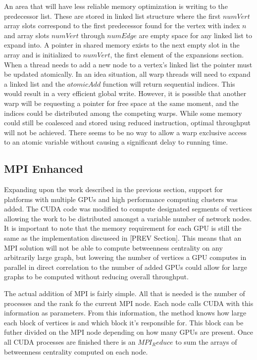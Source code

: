 \documentclass[12pt,twocolumn]{article}
\begin{document}
An area that will have less reliable memory optimization is writing to the predecessor list. These are stored in linked list structure where the first $numVert$ array slots correspond to the first predecessor found for the vertex with index $n$ and array slots $numVert$ through $numEdge$ are empty space for any linked list to expand into. A pointer in shared memory exists to the next empty slot in the array and is initialized to $numVert$, the first element of the expansions section. When a thread needs to add a new node to a vertex's linked list the pointer must be updated atomically. In an idea situation, all warp threads will need to expand a linked list and the $atomicAdd$ function will return sequential indices. This would result in a very efficient global write. However, it is possible that another warp will be requesting a pointer for free space at the same moment, and the indices could be distributed among the competing warps. While some memory could still be coalesced and stored using reduced instruction, optimal throughput will not be achieved. There seems to be no way to allow a warp exclusive access to an atomic variable without causing a significant delay to running time.

\subsection{MPI Enhanced}
Expanding upon the work described in the previous section, support for platforms with multiple GPUs and high performance computing clusters was added. The CUDA code was modified to compute designated segments of vertices allowing the work to be distributed amongst a variable number of network nodes. It is important to note that the memory requirement for each GPU is still the same as the implementation discuseed in [PREV Section]. This means that an MPI solution will not be able to compute betweenness centrality on any arbitrarily large graph, but lowering the number of vertices a GPU computes in parallel in direct correlation to the number of added GPUs could allow for large graphs to be computed without reducing overall throughput.

The actual addition of MPI is fairly simple. All that is needed is the number of processes and the rank fo the current MPI node. Each node calls CUDA with this information as parameters. From this information, the method knows how large each block of vertices is and which block it's responsible for. This block can be futher divided on the MPI node depending on how many GPUs are present. Once all CUDA processes are finished there is an $MPI_Reduce$ to sum the arrays of betweenness centrality computed on each node.
\end{document}
